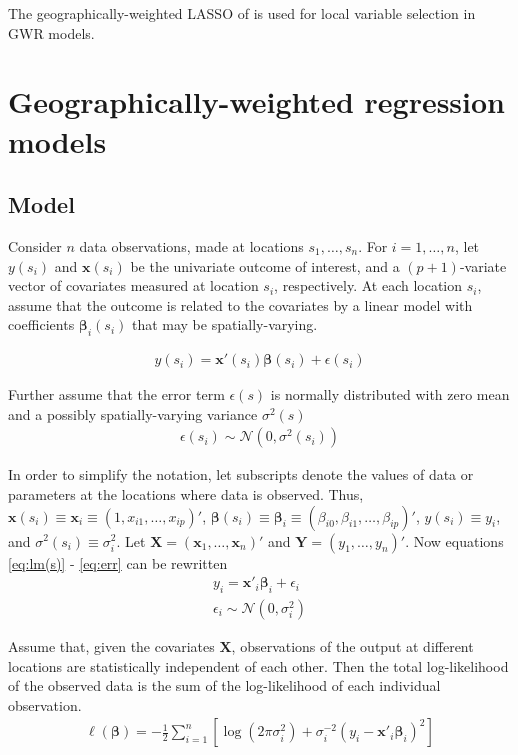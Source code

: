 \documentclass[authoryear, review, 11pt]{elsarticle}
\begin{document}
	The geographically-weighted LASSO of \cite{Wheeler:2009} is used for local variable selection in GWR models. \\

	
\section{Geographically-weighted regression models \label{section:GWR}}

	\subsection{Model}
	Consider $n$ data observations, made at locations $s_1, \dots, s_n$. For $i = 1, \dots, n$, let $y(s_i)$ and $\bm{x}(s_i)$ be the univariate outcome of interest, and a $(p+1)$-variate vector of covariates measured at location $s_i$, respectively. At each location $s_i$, assume that the outcome is related to the covariates by a linear model with coefficients $\bm{\beta}_i(s_i)$ that may be spatially-varying.

	\begin{eqnarray}
		y(s_i) = \bm{x}'(s_i) \bm{\beta}(s_i) + \epsilon(s_i)
	\label{eq:lm(s)}
	\end{eqnarray}
	
	Further assume that the error term $\epsilon(s)$ is normally distributed with zero mean and a possibly spatially-varying variance $\sigma^2(s)$
	\begin{eqnarray}
		\epsilon(s_i) \sim \mathcal{N} \left( 0,\sigma^2(s_i) \right)
	\label{eq:err}
	\end{eqnarray}
	
	In order to simplify the notation, let subscripts denote the values of data or parameters at the locations where data is observed. Thus, $\bm{x}(s_i) \equiv \bm{x}_i \equiv \left( 1, x_{i1}, \dots, x_{ip} \right)'$, $\bm{\beta}(s_i) \equiv \bm{\beta}_i \equiv \left(\beta_{i0}, \beta_{i1}, \dots, \beta_{ip} \right)'$, $y(s_i) \equiv y_i$, and $\sigma^2(s_i) \equiv \sigma^2_i$. Let $\bm{X} = \left( \bm{x}_1, \dots, \bm{x}_n \right)'$ and $\bm{Y} = \left( y_1, \dots, y_n \right)'$. Now equations \ref{eq:lm(s)} - \ref{eq:err} can be rewritten
	\begin{eqnarray}
		y_i = \bm{x}'_i \bm{\beta}_i + \epsilon_i\\
		\epsilon_i \sim \mathcal{N} \left( 0,\sigma_i^2 \right)
	\end{eqnarray}
	
	Assume that, given the covariates $\bm{X}$, observations of the output at different locations are statistically independent of each other. Then the total log-likelihood of the observed data is the sum of the log-likelihood of each individual observation.
	 \begin{eqnarray}
	 	\ell\left( \bm{\beta} \right) = - \frac{1}{2} \sum_{i=1}^n \left[  \log \left( 2 \pi \sigma^2_i\right) +  \sigma^{-2}_i  \left(y_i - \bm{x}'_i\bm{\beta}_i \right)^2  \right]
	\end{eqnarray}
	
\end{document}
